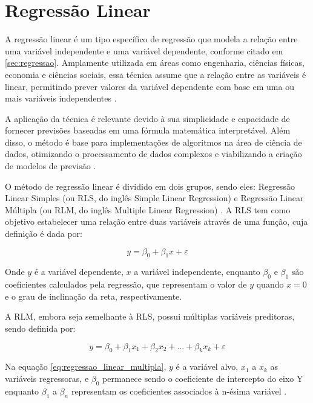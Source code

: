 \section{Regressão Linear}
\label{sec:regressao-linear}

A regressão linear é um tipo específico de regressão que modela a relação entre uma variável independente e uma variável dependente, conforme citado em \ref{sec:regressao}. Amplamente utilizada em áreas como engenharia, ciências físicas, economia e ciências sociais, essa técnica assume que a relação entre as variáveis é linear, permitindo prever valores da variável dependente com base em uma ou mais variáveis independentes \cite{montgomery2012}.

A aplicação da técnica é relevante devido à sua simplicidade e capacidade de fornecer previsões baseadas em uma fórmula matemática interpretável. Além disso, o método é base para implementações de algoritmos na área de ciência de dados, otimizando o processamento de dados complexos e viabilizando a criação de modelos de previsão \cite{aws2024}.

O método de regressão linear é dividido em dois grupos, sendo eles: Regressão Linear Simples (ou \gls{RLS}, do inglês Simple Linear Regression) e Regressão Linear Múltipla (ou \gls{RLM}, do inglês Multiple Linear Regression) \cite{montgomery2012}. A RLS tem como objetivo estabelecer uma relação entre duas variáveis através de uma função, cuja definição é dada por:

\begin{equation}
	y = \beta_0 + \beta_1 x + \varepsilon
	\label{eq:regressao_linear_simples}
\end{equation}

Onde $y$ é a variável dependente, $x$ a variável independente, enquanto $\beta_0$ e $\beta_1$ são coeficientes calculados pela regressão, que representam o valor de $y$ quando $x=0$ e o grau de inclinação da reta, respectivamente.

A RLM, embora seja semelhante à RLS, possui múltiplas variáveis preditoras, sendo definida por:

\begin{equation}
	y = \beta_0 + \beta_1 x_{1} + \beta_2 x_{2} + ... + \beta_k x_{k} + \varepsilon
	\label{eq:regressao_linear_multipla}
\end{equation}

Na equação \ref{eq:regressao_linear_multipla}, $y$ é a variável alvo, $x_{1}$ a $x_{k}$ as variáveis regressoras, e $\beta_0$ permanece sendo o coeficiente de intercepto do eixo Y enquanto $\beta_1$ a $\beta_n$ representam os coeficientes associados à n-ésima variável \cite{sassi2012}.

